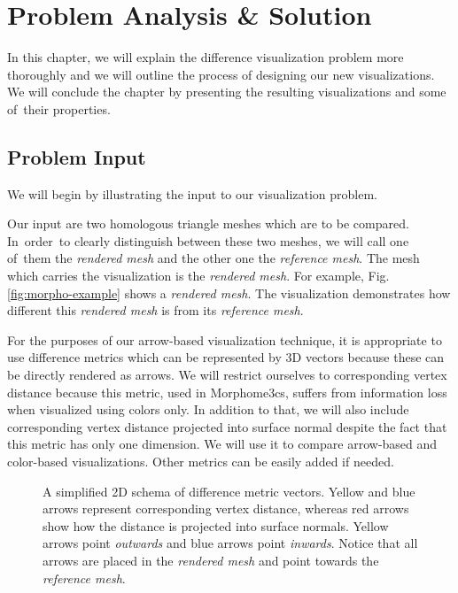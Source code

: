 \chapter{Problem Analysis \& Solution}
\label{chap:analysis}

In this chapter, we will explain the difference visualization problem more thoroughly and we will outline the process of designing our new visualizations. We will conclude the chapter by presenting the resulting visualizations and some of~their properties.

\section{Problem Input}
\label{sec:analysis-input}

We will begin by illustrating the input to our visualization problem.

Our input are two homologous triangle meshes which are to be compared. In~order~to clearly distinguish between these two meshes, we will call one of~them the {\it rendered mesh} and the other one the {\it reference mesh}. The mesh which carries the visualization is the {\it rendered mesh}. For example, Fig. \ref{fig:morpho-example} shows a {\it rendered mesh}. The visualization demonstrates how different this {\it rendered mesh} is from its {\it reference mesh}.

For the purposes of our arrow-based visualization technique, it is appropriate to use difference metrics which can be represented by 3D vectors because these can be directly rendered as arrows. We will restrict ourselves to corresponding vertex distance because this metric, used in Morphome3cs, suffers from information loss when visualized using colors only. In addition to that, we will also include corresponding vertex distance projected into surface normal despite the fact that this metric has only one dimension. We will use it to compare arrow-based and color-based visualizations. Other metrics can be easily added if needed.

\begin{figure}[h]
	\centering
	\def\svgwidth{\textwidth}
	
	\caption[Input Illustration]{A simplified 2D schema of difference metric vectors. Yellow and blue arrows represent corresponding vertex distance, whereas red arrows show how the distance is projected into surface normals. Yellow arrows point {\it outwards} and blue arrows point {\it inwards}. Notice that all arrows are placed in the {\it rendered mesh} and point towards the {\it reference mesh}.}
	\label{fig:illustration-problem_input}
\end{figure}


